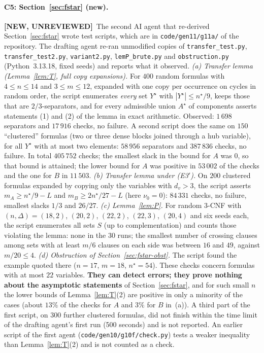 \documentclass[11pt,a4paper]{article}
\newcommand{\NEWU}{\textbf{[NEW, UNREVIEWED]}}
\theoremstyle{definition}
\theoremstyle{remark}
\begin{document}
\paragraph{C5: Section~\ref{sec:fstar} (new).} \NEWU\ The second AI agent that re-derived
Section~\ref{sec:fstar} wrote test scripts, which are in \texttt{code/gen11/g11a/} of the
repository. The drafting agent re-ran unmodified copies of
\texttt{transfer\_test.py}, \texttt{transfer\_test2.py}, \texttt{variant2.py},
\texttt{lemP\_brute.py} and \texttt{obstruction.py} (Python~3.13.18, fixed seeds) and
reports what it observed.
\emph{(a) Transfer lemma (Lemma~\ref{lem:T}, full copy expansions).} For $400$ random
formulas with $4\le n\le14$ and $3\le m\le12$, expanded with one copy per occurrence on
cycles in random order, the script enumerates \emph{every} set $Y^\star$ with
$|Y^\star|\le n^\star/9$, keeps those that are $2/3$-separators, and for every admissible
union $A^\star$ of components asserts statements (1) and (2) of the lemma in exact
arithmetic. Observed: $1\,698$ separators and $17\,916$ checks, no
failure. A second script does the same on $150$ ``clustered'' formulas (two or three dense
blocks joined through a hub variable), for all $Y^\star$ with at most two elements:
$58\,956$ separators and $387\,836$ checks, no failure. In total $405\,752$ checks; the
smallest slack in the bound for $A$ was $0$, so that bound is attained; the lower bound for
$A$ was positive in $53\,002$ of the checks and the one for $B$ in $11\,503$.
\emph{(b) Transfer lemma under \textup{(E3$'$)}.} On $200$ clustered formulas expanded by
copying only the variables with $d_v>3$, the script asserts
$m_A\ge n^\star/9-L$ and $m_B\ge2n^\star/27-L$ (here $\nu_0=0$): $84\,331$ checks, no
failure, smallest slacks $1/3$ and $26/27$.
\emph{(c) Lemma~\ref{lem:P}.} For random 3-CNF with $(n,\Delta)=(18,2)$, $(20,2)$, $(22,2)$,
$(22,3)$, $(20,4)$ and six seeds each, the script enumerates all sets $S$ (up to
complementation) and counts those
violating the lemma: none in the $30$ runs; the smallest number of crossing clauses among
sets with at least $m/6$ clauses on each side was between $16$ and $49$, against
$m/20\le4$.
\emph{(d) Obstruction of Section~\ref{sec:fstar-obst}.} The script found the example quoted
there ($n=17$, $m=18$, $n^\star=54$).
These checks concern formulas with at most $22$ variables. \textbf{They can detect errors;
they prove nothing about the asymptotic statements} of Section~\ref{sec:fstar}, and for
such small $n$ the lower bounds of Lemma~\ref{lem:T}(2) are positive in only a minority of
the cases (about $13\%$ of the checks for $A$ and $3\%$ for $B$ in~(a)). A third part of
the first script, on $300$ further clustered formulas, did not finish within the time
limit of the drafting agent's first run (500 seconds) and is not reported. An earlier script of the first agent
(\texttt{code/gen10/g10f/check.py}) tests a weaker inequality than Lemma~\ref{lem:T}(2) and
is not counted as a check.
\end{document}
